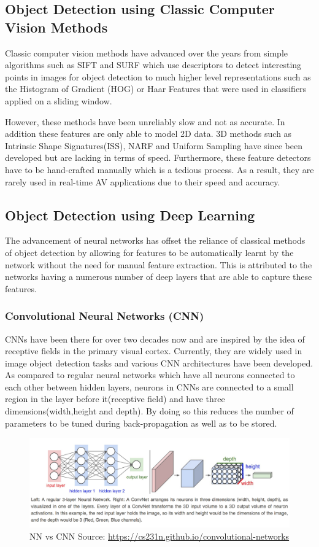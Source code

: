 \subsection{Object Detection using Classic Computer Vision Methods}
Classic computer vision methods have advanced over the years from simple algorithms such as SIFT\cite{lowe1999object} and SURF\cite{bay2006surf} which use descriptors to detect interesting points in images for object detection to much higher level representations such as the Histogram of Gradient (HOG)\cite{dalal2005histograms} or Haar Features\cite{viola2001rapid}  that were used in classifiers applied on a sliding window. 

However, these methods have been unreliably slow and not as accurate. In addition these features are only able to model 2D data. 3D methods such as Intrinsic Shape Signatures(ISS)\cite{zhong2009intrinsic}, NARF\cite{steder2010narf} and Uniform Sampling have since been developed but are lacking in terms of speed. Furthermore, these feature detectors have to be hand-crafted manually which is a tedious process. As a result, they are rarely used in real-time AV applications due to their speed and accuracy.

\subsection{Object Detection using Deep Learning}
The advancement of neural networks has offset the reliance of classical methods of object detection by allowing for features to be automatically learnt by the network without the need for manual feature extraction. This is attributed to the networks having a numerous number of deep layers that are able to capture these features.  
\subsubsection*{Convolutional Neural Networks (CNN)}
CNNs have been there for over two decades now and are inspired by the idea of receptive fields in the primary visual cortex. Currently, they are widely used in image object detection tasks and various CNN architectures have been developed. As compared to regular neural networks which have all neurons connected to each other between hidden layers, neurons in CNNs are connected to a small region in the layer before it(receptive field) and have three dimensions(width,height and depth). By doing so this reduces the number of parameters to be tuned during back-propagation as well as to be stored. 
\begin{figure}[h]
	\centering 
	\includegraphics[width=\linewidth]{images/neuralnet}
	\caption{NN vs CNN Source: \url{https://cs231n.github.io/convolutional-networks}}
	\label{fig:cnn}
\end{figure}


